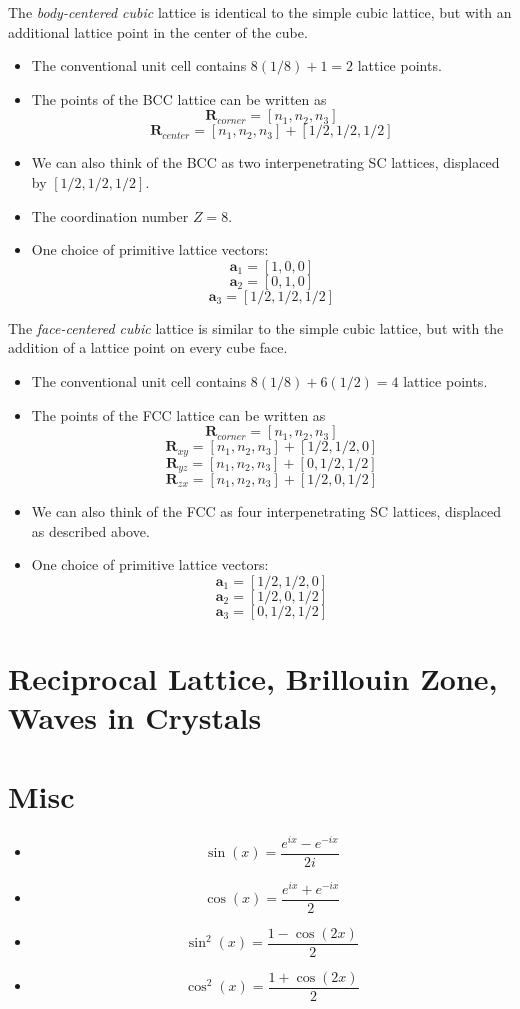 \documentclass[10pt]{article}
\begin{document}
The \emph{body-centered cubic} lattice is identical to the simple cubic lattice, but with an additional
lattice point in the center of the cube.
\begin{itemize}
  \item The conventional unit cell contains $8(1/8) + 1 = 2$ lattice points.
  \item The points of the BCC lattice can be written as
  $$\textbf{R}_{corner} = [n_{1}, n_{2}, n_{3}]$$
  $$\textbf{R}_{center} = [n_{1}, n_{2}, n_{3}] + [1/2, 1/2, 1/2]$$
  \item We can also think of the BCC as two interpenetrating SC lattices, displaced by $[1/2, 1/2, 1/2]$.
  \item The coordination number $Z = 8$.
  \item One choice of primitive lattice vectors:
  $$\textbf{a}_{1} = [1, 0, 0]$$
  $$\textbf{a}_{2} = [0, 1, 0]$$
  $$\textbf{a}_{3} = [1/2, 1/2, 1/2]$$

\end{itemize}

The \emph{face-centered cubic} lattice is similar to the simple cubic lattice, but with the addition of a
lattice point on every cube face.
\begin{itemize}
\item The conventional unit cell contains $8(1/8) + 6(1/2) = 4$ lattice points.
\item The points of the FCC lattice can be written as
$$\textbf{R}_{corner} = [n_{1}, n_{2}, n_{3}]$$
$$\textbf{R}_{xy} = [n_{1}, n_{2}, n_{3}] + [1/2, 1/2, 0]$$
$$\textbf{R}_{yz} = [n_{1}, n_{2}, n_{3}] + [0, 1/2, 1/2]$$
$$\textbf{R}_{zx} = [n_{1}, n_{2}, n_{3}] + [1/2, 0, 1/2]$$
\item We can also think of the FCC as four interpenetrating SC lattices, displaced as described above.
\item One choice of primitive lattice vectors:
$$\textbf{a}_{1} = [1/2, 1/2, 0]$$
$$\textbf{a}_{2} = [1/2, 0, 1/2]$$
$$\textbf{a}_{3} = [0, 1/2, 1/2]$$
\end{itemize}

\section{Reciprocal Lattice, Brillouin Zone, Waves in Crystals}


\section{Misc}
\begin{itemize}
  \item $$\sin(x) = \frac{e^{ix} - e^{-ix}}{2i}$$
  \item $$\cos(x) = \frac{e^{ix} + e^{-ix}}{2}$$
  \item $$\sin^{2}(x) = \frac{1 - \cos(2x)}{2}$$
  \item $$\cos^{2}(x) = \frac{1 + \cos(2x)}{2}$$
\end{itemize}
\end{document}
